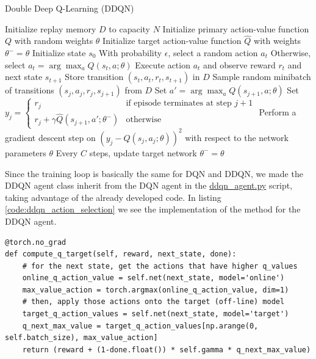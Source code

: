 \begin{algorithm}[!h]
	\caption{Double Deep Q-Learning (DDQN)}
	\label{alg:ddqn_pseudocode}
	\begin{algorithmic}[1]
		\State Initialize replay memory $D$ to capacity $N$
		\State Initialize primary action-value function $Q$ with random weights $\theta$
		\State Initialize target action-value function $\hat{Q}$ with weights $\theta^- = \theta$
		\State Initialize state $s_0$
		\State With probability $\epsilon$, select a random action $a_t$
		\State Otherwise, select $a_t = \arg\max_a Q(s_t, a; \theta)$
		\State Execute action $a_t$ and observe reward $r_t$ and next state $s_{t+1}$
		\State Store transition $(s_t, a_t, r_t, s_{t+1})$ in $D$
		\State Sample random minibatch of transitions $(s_j, a_j, r_j, s_{j+1})$ from $D$
		\State Set $a' = \arg\max_a Q(s_{j+1}, a; \theta)$
		\State Set $y_j = 
		\begin{cases} 
			r_j & \text{if episode terminates at step } j+1 \\
			r_j + \gamma \hat{Q}(s_{j+1}, a'; \theta^-) & \text{otherwise}
		\end{cases}$
		\State Perform a gradient descent step on $(y_j - Q(s_j, a_j; \theta))^2$ with respect to the network parameters $\theta$
		\State Every $C$ steps, update target network $\theta^- = \theta$
		\EndFor
		\EndFor
	\end{algorithmic}
\end{algorithm}


Since the training loop is basically the same for DQN and DDQN, we made the DDQN agent class inherit from the DQN agent in the \href{https://github.com/Javimh18/DL_TFM/blob/main/src/agents/ddqn_agent.py}{ddqn\_agent.py} script, taking advantage of the already developed code. In listing \ref{code:ddqn_action_selection} we see the implementation of the  method for the DDQN agent.

\begin{lstlisting}[caption={DDQN action selection algorithm}, label={code:ddqn_action_selection}]
@torch.no_grad
def compute_q_target(self, reward, next_state, done):
	# for the next state, get the actions that have higher q_values
	online_q_action_value = self.net(next_state, model='online')
	max_value_action = torch.argmax(online_q_action_value, dim=1)
	# then, apply those actions onto the target (off-line) model
	target_q_action_values = self.net(next_state, model='target')
	q_next_max_value = target_q_action_values[np.arange(0, self.batch_size), max_value_action]
	return (reward + (1-done.float()) * self.gamma * q_next_max_value)
\end{lstlisting}

